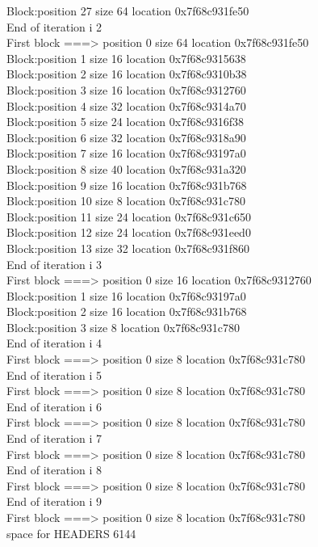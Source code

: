 \documentclass[a4paper,10pt]{article}
\begin{document}
   Block:position 27 size 64 location 0x7f68c931fe50\\
End of iteration i 2\\
First block ===> position 0 size 64 location 0x7f68c931fe50\\
   Block:position 1 size 16 location 0x7f68c9315638\\
   Block:position 2 size 16 location 0x7f68c9310b38\\
   Block:position 3 size 16 location 0x7f68c9312760\\
   Block:position 4 size 32 location 0x7f68c9314a70\\
   Block:position 5 size 24 location 0x7f68c9316f38\\
   Block:position 6 size 32 location 0x7f68c9318a90\\
   Block:position 7 size 16 location 0x7f68c93197a0\\
   Block:position 8 size 40 location 0x7f68c931a320\\
   Block:position 9 size 16 location 0x7f68c931b768\\
   Block:position 10 size 8 location 0x7f68c931c780\\
   Block:position 11 size 24 location 0x7f68c931c650\\
   Block:position 12 size 24 location 0x7f68c931eed0\\
   Block:position 13 size 32 location 0x7f68c931f860\\
End of iteration i 3\\
First block ===> position 0 size 16 location 0x7f68c9312760\\
   Block:position 1 size 16 location 0x7f68c93197a0\\
   Block:position 2 size 16 location 0x7f68c931b768\\
   Block:position 3 size 8 location 0x7f68c931c780\\
End of iteration i 4\\
First block ===> position 0 size 8 location 0x7f68c931c780\\
End of iteration i 5\\
First block ===> position 0 size 8 location 0x7f68c931c780\\
End of iteration i 6\\
First block ===> position 0 size 8 location 0x7f68c931c780\\
End of iteration i 7\\
First block ===> position 0 size 8 location 0x7f68c931c780\\
End of iteration i 8\\
First block ===> position 0 size 8 location 0x7f68c931c780\\
End of iteration i 9\\
First block ===> position 0 size 8 location 0x7f68c931c780\\
space for HEADERS 6144\\
\vspace{5mm}
\end{document}

